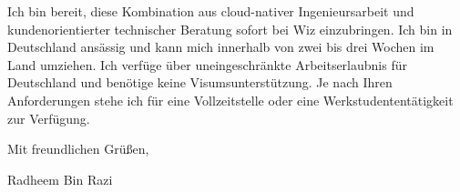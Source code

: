 \documentclass[11pt,a4paper]{coverletter}
\begin{document}
Ich bin bereit, diese Kombination aus cloud-nativer Ingenieursarbeit und kundenorientierter technischer Beratung sofort bei Wiz einzubringen. Ich bin in Deutschland ansässig und kann mich innerhalb von zwei bis drei Wochen im Land umziehen. Ich verfüge über uneingeschränkte Arbeitserlaubnis für Deutschland und benötige keine Visumsunterstützung. Je nach Ihren Anforderungen stehe ich für eine Vollzeitstelle oder eine Werkstudententätigkeit zur Verfügung.

\closing{Mit freundlichen Grüßen,}{Radheem Bin Razi}
\end{document}
